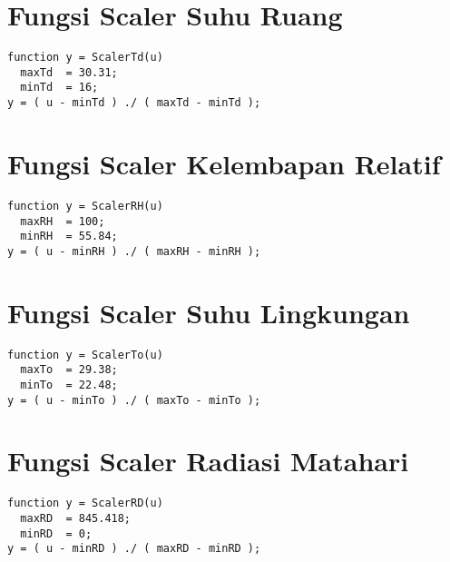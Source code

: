 \section{Fungsi Scaler Suhu Ruang}
\begin{lstlisting}
function y = ScalerTd(u)
  maxTd  = 30.31;
  minTd  = 16;
y = ( u - minTd ) ./ ( maxTd - minTd );
\end{lstlisting}
\hfill

\section{Fungsi Scaler Kelembapan Relatif}
\begin{lstlisting}
function y = ScalerRH(u)
  maxRH  = 100;
  minRH  = 55.84;
y = ( u - minRH ) ./ ( maxRH - minRH );
\end{lstlisting}
\hfill

\section{Fungsi Scaler Suhu Lingkungan}
\begin{lstlisting}
function y = ScalerTo(u)
  maxTo  = 29.38;
  minTo  = 22.48;
y = ( u - minTo ) ./ ( maxTo - minTo );
\end{lstlisting}
\hfill

\section{Fungsi Scaler Radiasi Matahari}
\begin{lstlisting}
function y = ScalerRD(u)
  maxRD  = 845.418;
  minRD  = 0;
y = ( u - minRD ) ./ ( maxRD - minRD );
\end{lstlisting}
\hfill
